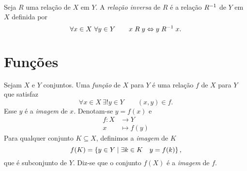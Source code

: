 \begin{defi}
Seja $R$ uma relação de $X$ em $Y$. A \emph{relação inversa} de $R$ é a relação $R^{-1}$ de $Y$ em $X$ definida por
	\begin{equation*}
	\forall x \in X\ \forall y \in Y \qquad x \mathrel{R} y \Leftrightarrow y \mathrel{R^{-1}} x.
	\end{equation*}
\end{defi}


\section{Funções}

\begin{defi}
Sejam $X$ e $Y$ conjuntos. Uma \emph{função} de $X$ para $Y$ é uma relação $f$ de $X$ para $Y$ que satisfaz
	\begin{equation*}
	\forall x \in X \ \exists! y \in Y \qquad (x,y) \in f.
	\end{equation*}
Esse $y$ é a \emph{imagem} de $x$. Denotam-se $y=f(x)$ e
	\begin{align*}
	f: X &\to Y \\
		x &\mapsto f(y)
	\end{align*}
Para qualquer conjunto $K \subseteq X$, definimos a \emph{imagem} de $K$
	\begin{equation*}
	f(K)=\left\{y \in Y \;\middle\vert\; \exists k \in K \quad y=f(k) \right\},
	\end{equation*}
que é subconjunto de $Y$. Diz-se que o conjunto $f(X)$ é a \emph{imagem} de $f$.
\end{defi}

